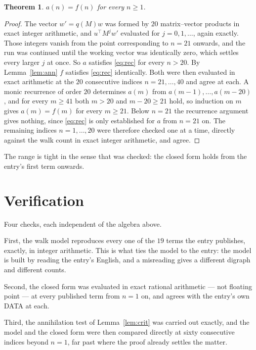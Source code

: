\documentclass[11pt,a4paper]{article}
\theoremstyle{plain}
\newtheorem{theorem}{Theorem}
\theoremstyle{definition}
\begin{document}
\begin{theorem}
$a(n)=f(n)$ for every $n\ge1$.
\end{theorem}

\begin{proof}
The vector $w'=q(M)w$ was formed by $20$ matrix--vector products in exact integer
arithmetic, and $u^{\!\top}M^{j}w'$ evaluated for $j=0,1,\dots$, again exactly. Those integers
vanish from the point corresponding to $n=21$ onwards, and the run was continued until the
working vector was identically zero, which settles every larger $j$ at once. So $a$ satisfies
\eqref{eq:rec} for every $n>20$. By Lemma~\ref{lem:ann} $f$ satisfies \eqref{eq:rec}
identically. Both were then evaluated in exact arithmetic at the $20$ consecutive indices
$n=21,\dots,40$ and agree at each. A monic recurrence of order $20$
determines $a(m)$ from $a(m-1),\dots,a(m-20)$, and for every $m\ge41$ both
$m>20$ and $m-20\ge21$ hold, so induction on $m$ gives $a(m)=f(m)$ for every
$m\ge21$.
Below $n=21$ the recurrence argument gives nothing, since \eqref{eq:rec} is only
established for $a$ from $n=21$ on. The remaining indices $n=1,\dots,20$ were
therefore checked one at a time, directly against the walk count in exact integer arithmetic,
and agree.
\end{proof}

The range is tight in the sense that was checked: the closed form holds from the entry's first term onwards.

\section{Verification}

Four checks, each independent of the algebra above.

First, the walk model reproduces every one of the $19$ terms the entry publishes,
exactly, in integer arithmetic. This is what ties the model to the entry: the model is built
by reading the entry's English, and a misreading gives a different digraph and different
counts.

Second, the closed form was evaluated in exact rational arithmetic --- not floating point ---
at every published term from $n=1$ on, and agrees with the entry's own DATA at each.

Third, the annihilation test of Lemma~\ref{lem:crit} was carried out exactly, and the model
and the closed form were then compared directly at sixty consecutive indices beyond
$n=1$, far past where the proof already settles the matter.
\end{document}
